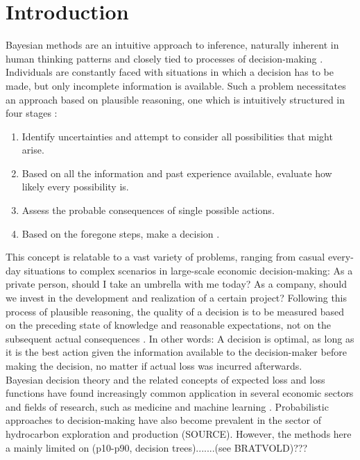\chapter{Introduction} \label{chap:intro}
Bayesian methods are an intuitive approach to inference, naturally inherent in human thinking patterns and closely tied to processes of decision-making \citep{berger2013stat, davidson2015, jaynes1986bayesian}. Individuals are constantly faced with situations in which a decision has to be made, but only incomplete information is available. Such a problem necessitates an approach based on plausible reasoning, one which is intuitively structured in four stages \citep{jaynes1986bayesian}:
\begin{enumerate}
	\item Identify uncertainties and attempt to consider all possibilities that might arise.
	\item Based on all the information and past experience available, evaluate how likely every possibility is.
	\item Assess the probable consequences of single possible actions.
	\item Based on the foregone steps, make a decision \citep{jaynes1986bayesian}.
\end{enumerate}
This concept is relatable to a vast variety of problems, ranging from casual every-day situations to complex scenarios in large-scale economic decision-making: As a private person, should I take an umbrella with me today? As a company, should we invest in the development and realization of a certain project? Following this process of plausible reasoning, the quality of a decision is to be measured based on the preceding state of knowledge and reasonable expectations, not on the subsequent actual consequences \citep{jaynes1986bayesian}. In other words: A decision is optimal, as long as it is the best action given the information available to the decision-maker before making the decision, no matter if actual loss was incurred afterwards.\\
Bayesian decision theory and the related concepts of expected loss and loss functions have found increasingly common application in several economic sectors and fields of research, such as medicine \citep{ashby2000evidence, ashby2006bayesian, moye2006statistical} and machine learning \citep{barber2012bayesian, theodoridis2015machine}. Probabilistic approaches to decision-making have also become prevalent in the sector of hydrocarbon exploration and production (SOURCE). However, the methods here a mainly limited on (p10-p90, decision trees).......(see BRATVOLD)???\\
